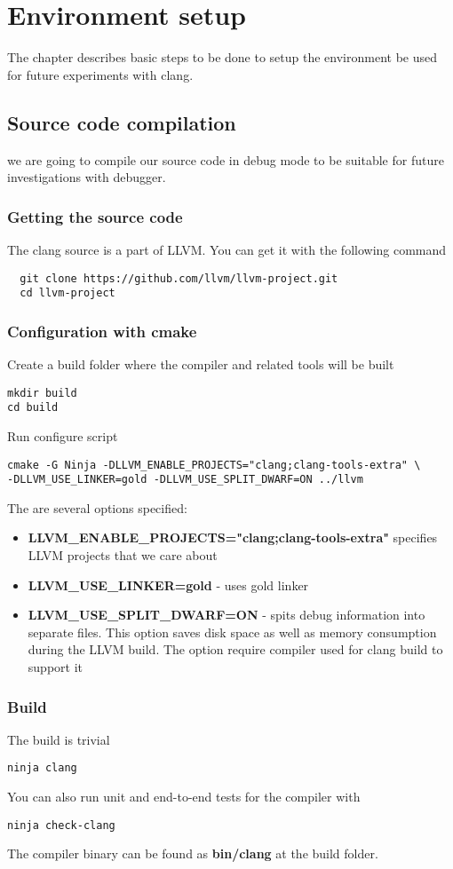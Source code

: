 \chapter{Environment setup}

The chapter describes basic steps to be done to setup the environment
be used for future experiments with clang.

\section{Source code compilation}

we are going to compile our source code in debug mode to be suitable
for future investigations with debugger.

\subsection{Getting the source code}

The clang source is a part of LLVM. You can get it with the following
command
\begin{verbatim}
  git clone https://github.com/llvm/llvm-project.git
  cd llvm-project
\end{verbatim}

\subsection{Configuration with cmake}
Create a build folder where the compiler and related tools will be
built
\begin{verbatim}
mkdir build
cd build
\end{verbatim}
Run configure script
\begin{verbatim}
cmake -G Ninja -DLLVM_ENABLE_PROJECTS="clang;clang-tools-extra" \
-DLLVM_USE_LINKER=gold -DLLVM_USE_SPLIT_DWARF=ON ../llvm
\end{verbatim}
The are several options specified:
\begin{itemize}
  \item \textbf{LLVM\_ENABLE\_PROJECTS="clang;clang-tools-extra"}
    specifies LLVM projects that we care about
\item \textbf{LLVM\_USE\_LINKER=gold} - uses gold linker
\item \textbf{LLVM\_USE\_SPLIT\_DWARF=ON} - spits debug information into
  separate files. This option saves disk space as well as memory
  consumption during the LLVM build. The option require compiler used
  for clang build to support it
\end{itemize}


\subsection{Build}
The build is trivial
\begin{verbatim}
ninja clang
\end{verbatim}
You can also run unit and end-to-end tests for the compiler with
\begin{verbatim}
ninja check-clang
\end{verbatim}
The compiler binary can be found as \textbf{bin/clang} at the build folder. 
